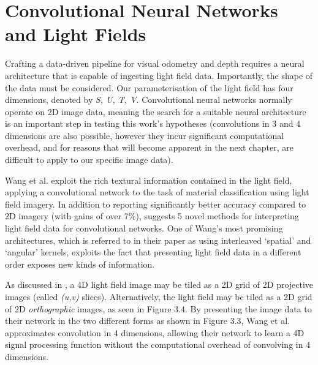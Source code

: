 \section{Convolutional Neural Networks and Light Fields}


Crafting a data-driven pipeline for visual odometry and depth requires a neural architecture that is capable of ingesting light field data. Importantly, the shape of the data must be considered. Our parameterisation of the light field has four dimensions, denoted by \textit{S, U, T, V}. Convolutional neural networks normally operate on 2D image data, meaning the search for a suitable neural architecture is an important step in testing this work's hypotheses (convolutions in 3 and 4 dimensions are also possible, however they incur significant computational overhead, and for reasons that will become apparent in the next chapter, are difficult to apply to our specific image data).


Wang et al. \cite{wang2016lfcnn} exploit the rich textural information contained in the light field, applying a convolutional network to the task of material classification using light field imagery. In addition to reporting significantly better accuracy compared to 2D imagery (with gains of over 7\%), \cite{wang2016lfcnn} suggests 5 novel methods for interpreting light field data for convolutional networks. One of Wang's most promising architectures, which is referred to in their paper as using interleaved `spatial' and `angular' kernels, exploits the fact that presenting light field data in a different order exposes new kinds of information. 

As discussed in \cite{dansereau2014phd}, a 4D light field image may be tiled as a 2D grid of 2D projective images (called \textit{(u,v)} slices). Alternatively, the light field may be tiled as a 2D grid of 2D \textit{orthographic} images, as seen in Figure 3.4. By presenting the image data to their network in the two different forms as shown in Figure 3.3, Wang et al. approximates convolution in 4 dimensions, allowing their network to learn a 4D signal processing function without the computational overhead of convolving in 4 dimensions.

